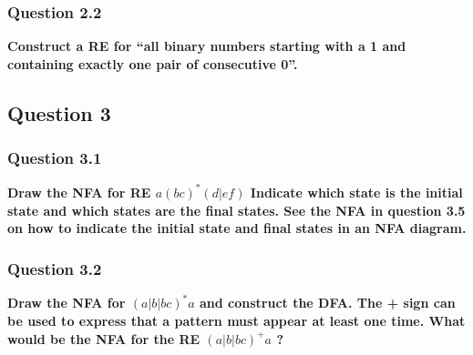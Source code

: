        
        
        \subsubsection{Question 2.2}
        \textbf{Construct a RE for “all binary numbers starting with a 1 and containing exactly one pair of
        consecutive 0”.} \\
        \begin{center}
            
        \end{center}

    \subsection{Question 3}
        \subsubsection{Question 3.1}
            \textbf{Draw the NFA for RE $a(bc)^{*}(d|ef)$
            Indicate which state is the initial state and which states are the final states. See the NFA in
            question 3.5 on how to indicate the initial state and final states in an NFA diagram.}

            
        \subsubsection{Question 3.2}
            \textbf{Draw the NFA for $(a|b|bc)^{*}a$ and construct the DFA. The + sign can be used to express that a pattern must appear at least one time. What would be the NFA for the RE $(a|b|bc)^{+}a$ ?}
            
